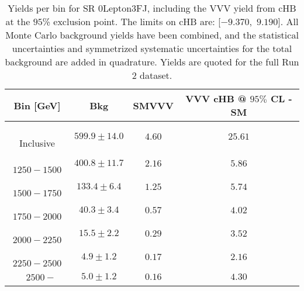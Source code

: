 \begin{table}[!htbp]
    \small
    \center
    \begin{tabular}{c||c|c|c}
    Bin [GeV] & Bkg & SMVVV & \pbox{20cm}{VVV \\ cHB @ $95\%$ CL - SM \\ }\\
    \hline
    \pbox{20cm}{ ~ \\Inclusive\\ } & $599.9 \pm 14.0$ & $4.60$ & $25.61$\\
    \hline
    \pbox{20cm}{ ~ \\$1250-1500$\\ } & $400.8 \pm 11.7$ & $2.16$ & $5.86$\\
    \hline
    \pbox{20cm}{ ~ \\$1500-1750$\\ } & $133.4 \pm 6.4$ & $1.25$ & $5.74$\\
    \hline
    \pbox{20cm}{ ~ \\$1750-2000$\\ } & $40.3 \pm 3.4$ & $0.57$ & $4.02$\\
    \hline
    \pbox{20cm}{ ~ \\$2000-2250$\\ } & $15.5 \pm 2.2$ & $0.29$ & $3.52$\\
    \hline
    \pbox{20cm}{ ~ \\$2250-2500$\\ } & $4.9 \pm 1.2$ & $0.17$ & $2.16$\\
    \hline
    \pbox{20cm}{ ~ \\$2500-$\\ } & $5.0 \pm 1.2$ & $0.16$ & $4.30$\\
\end{tabular}
    \caption{Yields per bin for SR 0Lepton3FJ, including the VVV yield from cHB at the $95$\% exclusion point. The limits on cHB are: [$-9.370$,~$9.190$]. All Monte Carlo background yields have been combined, and the statistical uncertainties and symmetrized systematic uncertainties for the total background are added in quadrature. Yields are quoted for the full Run 2 dataset.}
    \label{tab:0Lepton3FJ$binssignal}
\end{table}
